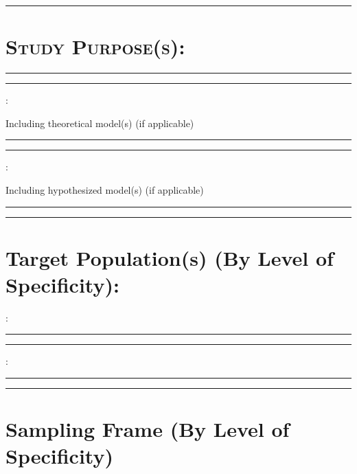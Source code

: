 \documentclass[11pt,]{tufte-book}
\newcommand{\SFrule}[1][0.1mm]{
    \begin{fullwidth}\textcolor{blublk}{\rule{\linewidth}{#1}}\end{fullwidth}
}
\begin{document}
\medskip

\SFrule

\section{\texorpdfstring{\textsc{Study Purpose(s):}}{}}\label{section}

\tufteskip

\SFrule

\medskip

\SFrule

:

\hspace*{2em} \small{Including theoretical model(s) (if applicable)}

\tufteskip

\SFrule

\medskip

\SFrule

:

\hspace*{2em} \small{Including hypothesized model(s) (if applicable)}

\tufteskip

\SFrule

\medskip

\SFrule

\tufteskip

\section{Target Population(s) (By Level of
Specificity):}\label{target-populations-by-level-of-specificity}

:

\medskip

\SFrule

\medskip

\SFrule

:

\medskip

\SFrule

\medskip

\SFrule

\section{Sampling Frame (By Level of
Specificity)}\label{sampling-frame-by-level-of-specificity}
\end{document}
